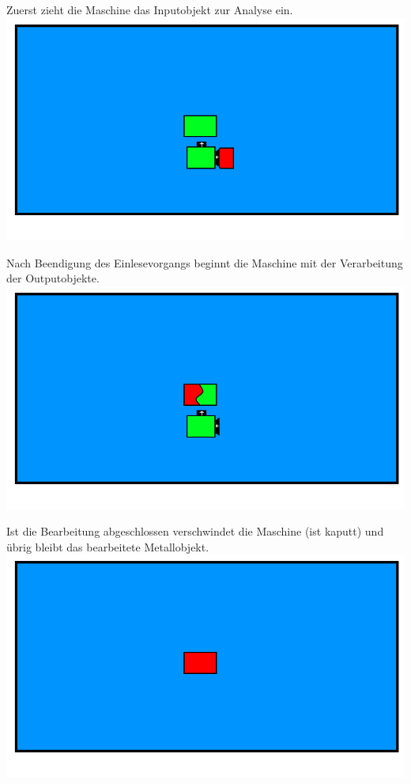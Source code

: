 \documentclass{scrartcl}
\begin{document}
\begin{description}
		\begin{minipage}{1\textwidth}
			Zuerst zieht die Maschine das Inputobjekt zur Analyse ein.\\ 
			\includegraphics[scale=0.5]{assets/AuswertungAnimPic2}
		\end{minipage}
		
		\begin{minipage}{1\textwidth}
			Nach Beendigung des Einlesevorgangs beginnt die Maschine mit der Verarbeitung der Outputobjekte.\\ 
			\includegraphics[scale=0.5]{assets/AuswertungAnimPic3}
		\end{minipage}
		
		\begin{minipage}{1\textwidth}
			Ist die Bearbeitung abgeschlossen verschwindet die Maschine (ist kaputt) und übrig bleibt das bearbeitete Metallobjekt.\\ 
			\includegraphics[scale=0.5]{assets/AuswertungAnimPic5}
		\end{minipage}
		

\end{description}
\end{document}
